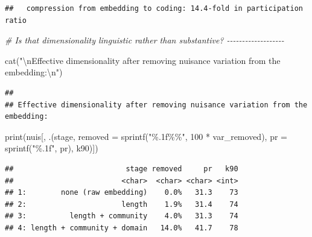 \documentclass[
  11pt,
]{article}
\newenvironment{Shaded}{\begin{snugshade}}{\end{snugshade}}
\newcommand{\AttributeTok}[1]{\textcolor[rgb]{0.77,0.63,0.00}{#1}}
\newcommand{\CommentTok}[1]{\textcolor[rgb]{0.56,0.35,0.01}{\textit{#1}}}
\newcommand{\DecValTok}[1]{\textcolor[rgb]{0.00,0.00,0.81}{#1}}
\newcommand{\FunctionTok}[1]{\textcolor[rgb]{0.00,0.00,0.00}{#1}}
\newcommand{\NormalTok}[1]{#1}
\newcommand{\SpecialCharTok}[1]{\textcolor[rgb]{0.00,0.00,0.00}{#1}}
\newcommand{\StringTok}[1]{\textcolor[rgb]{0.31,0.60,0.02}{#1}}
\begin{document}
\begin{verbatim}
##   compression from embedding to coding: 14.4-fold in participation ratio
\end{verbatim}

\begin{Shaded}
\begin{Highlighting}[]
\CommentTok{\# Is that dimensionality linguistic rather than substantive? {-}{-}{-}{-}{-}{-}{-}{-}{-}{-}{-}{-}{-}{-}{-}{-}{-}{-}{-}}

\FunctionTok{cat}\NormalTok{(}\StringTok{"}\SpecialCharTok{\textbackslash{}n}\StringTok{Effective dimensionality after removing nuisance variation from the embedding:}\SpecialCharTok{\textbackslash{}n}\StringTok{"}\NormalTok{)}
\end{Highlighting}
\end{Shaded}

\begin{verbatim}
## 
## Effective dimensionality after removing nuisance variation from the embedding:
\end{verbatim}

\begin{Shaded}
\begin{Highlighting}[]
\FunctionTok{print}\NormalTok{(nuis[, .(stage, }\AttributeTok{removed =} \FunctionTok{sprintf}\NormalTok{(}\StringTok{"\%.1f\%\%"}\NormalTok{, }\DecValTok{100} \SpecialCharTok{*}\NormalTok{ var\_removed),}
                \AttributeTok{pr =} \FunctionTok{sprintf}\NormalTok{(}\StringTok{"\%.1f"}\NormalTok{, pr), k90)])}
\end{Highlighting}
\end{Shaded}

\begin{verbatim}
##                          stage removed     pr   k90
##                         <char>  <char> <char> <int>
## 1:        none (raw embedding)    0.0%   31.3    73
## 2:                      length    1.9%   31.4    74
## 3:          length + community    4.0%   31.3    74
## 4: length + community + domain   14.0%   41.7    78
\end{verbatim}
\end{document}
